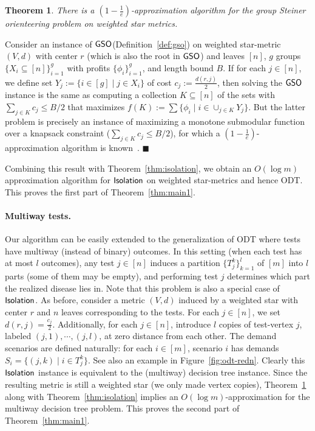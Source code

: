 \documentclass[11pt]{article}
\newtheorem{theorem}[thm]{Theorem}
\def\sse{\subseteq}
\def\odt{{\sf ODT}\xspace}
\newcommand{\profit}{\phi}
\def\isoprob{\ensuremath{{\sf Isolation}}\xspace}
\def\gso{\ensuremath{{\sf GSO}}\xspace}
\newenvironment{pf}{

\noindent{\bf Proof:}} {\hfill$\blacksquare$


}
\begin{document}
\begin{theorem}
  \label{th:gso-stars} There is a $(1-\frac1e)$-approximation algorithm for the group Steiner
  orienteering problem on weighted star metrics.
\end{theorem}
\begin{pf}
Consider an instance of \gso (Definition~\ref{def:gso}) on  weighted star-metric
  $(V,d)$ with center $r$ (which is also the root in \gso) and leaves $[n]$, $g$ groups $\{X_i\sse
  [n]\}_{i=1}^g$ with profits $\{\profit_i\}_{i=1}^g$, and length bound $B$.
  If for each $j\in[n]$, we define set $Y_j:= \{i\in [g]\mid j\in X_i\}$ of
  cost $c_j:=\frac{d(r,j)}2$, then solving the \gso instance is the same
  as computing a collection $K\sse [n]$ of the sets with $\sum_{j\in K}
  c_j\le B/2$ that maximizes $f(K):= \sum\{ \profit_i\mid i\in \cup_{j\in K}
  Y_j\}$. But the latter problem is precisely an instance of maximizing a monotone submodular
  function over a knapsack constraint ($\sum_{j\in K}
  c_j\le B/2$), for which a $(1-\frac1e)$-approximation algorithm is
  known~\cite{s04}.
\end{pf}

\medskip Combining this result with Theorem~\ref{thm:isolation}, we obtain an $O(\log m)$ approximation algorithm for \isoprob on weighted star-metrics and hence \odt. This
proves the first part of Theorem~\ref{thm:main1}.


\paragraph{Multiway tests.}  
Our algorithm
can be easily extended to the generalization of \odt where tests have multiway (instead of binary) outcomes.  In this setting (when each test has at
most $l$ outcomes), any test $j\in [n]$ induces a partition $\{T_j^k\}_{k=1}^l$ of $[m]$ into $l$ parts (some of them may be empty), and performing test $j$
determines which part the realized disease lies in. Note that this problem is also a special case of
\isoprob. As before, consider a metric $(V,d)$ induced by a weighted star with center $r$ and $n$ leaves corresponding
to the tests. For each $j\in [n]$, we set $d(r,j)=\frac{c_j}2$. Additionally, for each $j\in [n]$, introduce $l$ copies
of test-vertex $j$, labeled $(j,1),\cdots,(j,l)$, at zero distance from each other. The demand scenarios are defined
naturally: for each $i\in [m]$, scenario $i$ has demands $S_i=\{(j,k)\mid i\in T^k_j\}$. See also an example in
Figure~\ref{fig:odt-redn}. Clearly this \isoprob instance is equivalent to the (multiway) decision tree instance.
Since the resulting metric is still a weighted star (we only made vertex copies), Theorem~\ref{th:gso-stars} along with Theorem~\ref{thm:isolation} implies an $O(\log m)$-approximation for the multiway decision tree
problem. This proves the second part of Theorem~\ref{thm:main1}.
\end{document}
